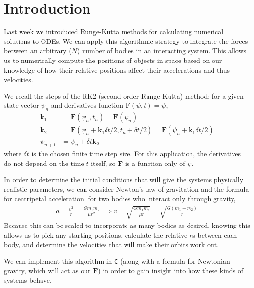 \documentclass{article}
\author{\hwauthor}
\title{\hwtitle}
\date{\hwdate}
\begin{document}
\maketitle
\thispagestyle{fancy}

\section{Introduction}

Last week we introduced Runge-Kutta methods for calculating numerical solutions to ODEs. We can apply this algorithmic strategy to integrate the forces between an arbitrary ($N$) number of bodies in an interacting system. This allows us to numerically compute the positions of objects in space based on our knowledge of how their relative positions affect their accelerations and thus velocities.

We recall the steps of the RK2 (second-order Runge-Kutta) method: for a given state vector $\psi_n$ and derivatives function $\mathbf{F}(\psi, t)=\dot{\psi}$, \begin{align}
    \mathbf{k}_1 &= \mathbf{F}(\psi_n, t_n) = \mathbf{F}(\psi_n) \nonumber \\ \label{eq:rk2}
    \mathbf{k}_2 &= \mathbf{F}(\psi_n + \mathbf{k}_1 \delta t/2, t_n+\delta t/2) = \mathbf{F}(\psi_n + \mathbf{k}_1 \delta t/2) \\ \nonumber
    \psi_{n+1} &= \psi_n + \delta t \mathbf{k}_2
\end{align}
where $\delta t$ is the chosen finite time step size. For this application, the derivatives do not depend on the time $t$ itself, so $\mathbf{F}$ is a function only of $\psi$.

In order to determine the initial conditions that will give the systems physically realistic parameters, we can consider Newton's law of gravitation and the formula for centripetal acceleration: for two bodies who interact only through gravity, \begin{gather}  \label{eq:velocity}
    a=\frac{v^2}{r} = \frac{Gm_1m_2}{\mu r^2} \implies v = \sqrt{\frac{Gm_1m_2}{\mu r}} = \sqrt{\frac{G(m_1+m_2)}{r}}
\end{gather}
Because this can be scaled to incorporate as many bodies as desired, knowing this allows us to pick any starting positions, calculate the relative $r$s between each body, and determine the velocities that will make their orbits work out.

We can implement this algorithm in \texttt{C} (along with a formula for Newtonian gravity, which will act as our $\mathbf{F}$) in order to gain insight into how these kinds of systems behave.
\end{document}

